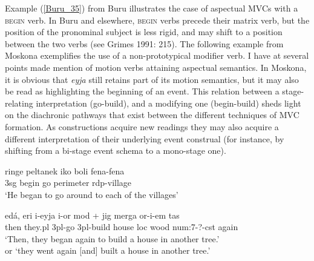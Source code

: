 Example (\ref{Buru_35}) from Buru illustrates the case of aspectual MVCs with a \textsc{begin} verb. In Buru and elsewhere, \textsc{begin} verbs precede their matrix verb, but the position of the pronominal subject is less rigid, and may shift to a position between the two verbs (see Grimes 1991: 215). The following example from Moskona exemplifies the use of a non-prototypical modifier verb. I have at several points made mention of motion verbs attaining aspectual semantics. In Moskona, it is obvious that \textit{eyja} still retains part of its motion semantics, but it may also be read as highlighting the beginning of an event. This relation between a stage-relating interpretation (go-build), and a modifying one (begin-build) sheds light on the diachronic pathways that exist between the different techniques of MVC formation. As constructions acquire new readings they may also acquire a different interpretation of their underlying event construal (for instance, by shifting from a bi-stage event schema to a mono-stage one).

\ea \label{Buru_35}
\gll ringe peltanek iko boli fena-fena \\
3\acs{sg} begin go perimeter \acs{rdp}-village \\
\glft `He began to go around to each of the villages' \\ 
\z
\xe

\ea \label{Moskona_48}
\gll edá, eri i-eyja i-or mod + jig merga or-i-em tas \\
then they.\acs{pl} 3\acs{pl}-go 3\acs{pl}-build house \acs{loc} wood \acs{num}:7-?-\acs{cst} again \\
\glft `Then, they began again to build a house in another tree.’ \\
or `they went again [and] built a house in another tree.’ \\ 
\z
\xe


